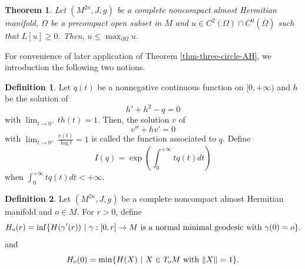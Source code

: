 \documentclass[12pt]{amsart}
\def\ol{\overline}
\def\p{\partial}
\def\ol{\overline}
\newtheorem{thm}{Theorem}[section]
\theoremstyle{definition}
\newtheorem{defn}{Definition}[section]
\theoremstyle{remark}
\numberwithin{equation}{section}
\def\D{\displaystyle}
\begin{document}
\begin{thm}\label{thm-max-principle-AH}
Let $(M^{2n}, J,g)$ be a complete noncompact almost Hermitian manifold, $\Omega$ be a precompact open subset in $M$ and $u\in C^2(\Omega)\cap C^0(\ol\Omega)$ such that $L[u]\geq 0$. Then, $u\leq \max_{\p\Omega}u$.
\end{thm}


For convenience of later application of Theorem \ref{thm-three-circle-AH}, we introduction the following two notions.
\begin{defn}
Let $q(t)$ be a nonnegative continuous function on $[0,+\infty)$ and $h$ be the solution of $$h'+h^2-q=0$$ with $\D\lim_{t\to 0^+}th(t)=1$. Then, the solution $v$ of $$v''+hv'=0$$
with $\D\lim_{t\to 0^+}\frac{v(t)}{\log t}=1$ is called the function associated to $q$. Define
\begin{equation}
I(q)=\exp\left(\int_0^{+\infty} tq(t)dt\right)
\end{equation}
when $\D\int_0^{+\infty}t q(t)dt<+\infty$.
\end{defn}
\begin{defn}
Let $(M^{2n},J,g)$ be a complete noncompact almost Hermitian manifold and $o\in M$. For $r>0$, define
\begin{equation*}
H_o(r)=\inf\{H(\gamma'(r))\ |\  \gamma:[0,r]\to M {\rm \ is\ a\ normal\ minimal\ geodesic\ with\  } \gamma(0)=o\}.
\end{equation*}
and
\begin{equation*}
H_o(0)=\min\{H(X)\ |\ X\in T_oM\ {\rm with}\ \|X\|=1\}.
\end{equation*}
\end{defn}
\end{document}
